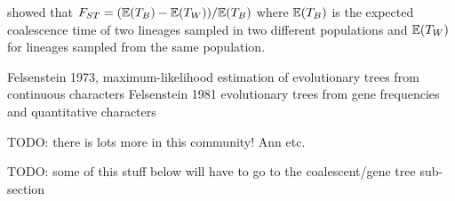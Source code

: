 \cite{slatkin1991inbreeding} showed that $F_{ST} = (\mathbb{E}(T_B) - \mathbb{E}(T_W)) / \mathbb{E}(T_B)$
where $\mathbb{E}(T_B)$ is the expected coalescence time of two lineages sampled in two
different populations and $\mathbb{E}(T_W)$ for lineages sampled from the same population.

Felsenstein 1973, maximum-likelihood estimation of evolutionary trees from continuous characters
Felsenstein 1981 evolutionary trees from gene frequencies and quantitative characters


TODO: there is lots more in this community! Ann etc.

TODO: some of this stuff below will have to go to the coalescent/gene tree sub-section

%
%
%
%


%

